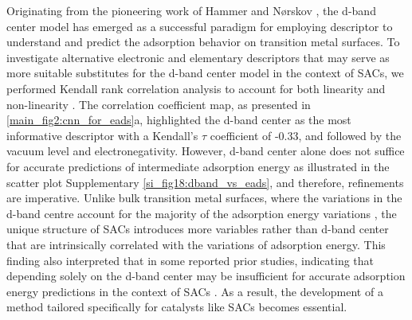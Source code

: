 Originating from the pioneering work of Hammer and Nørskov \cite{hammer2000theoretical}, the d-band center model has emerged as a successful paradigm for employing descriptor to understand and predict the adsorption behavior on transition metal surfaces.
To investigate alternative electronic and elementary descriptors that may serve as more suitable substitutes for the d-band center model in the context of SACs, we performed Kendall rank correlation analysis to account for both linearity and non-linearity \cite{kendall1938new}.
The correlation coefficient map, as presented in \cref{main_fig2:cnn_for_eads}a, highlighted the d-band center as the most informative descriptor with a Kendall's $\tau$ coefficient of -0.33, and followed by the vacuum level and electronegativity.
However, d-band center alone does not suffice for accurate predictions of intermediate adsorption energy as illustrated in the scatter plot Supplementary \cref{si_fig18:dband_vs_eads}, and therefore, refinements are imperative.
Unlike bulk transition metal surfaces, where the variations in the d-band centre account for the majority of the adsorption energy variations \cite{norskov2011density, takigawa2016machine}, the unique structure of SACs introduces more variables rather than d-band center that are intrinsically correlated with the variations of adsorption energy.
This finding also interpreted that in some reported prior studies, indicating that depending solely on the d-band center may be insufficient for accurate adsorption energy predictions in the context of SACs \cite{sun2022going, fung2020descriptors, di2022universal, yuan2020descriptor, huang2020rational}.
As a result, the development of a method tailored specifically for catalysts like SACs becomes essential.

